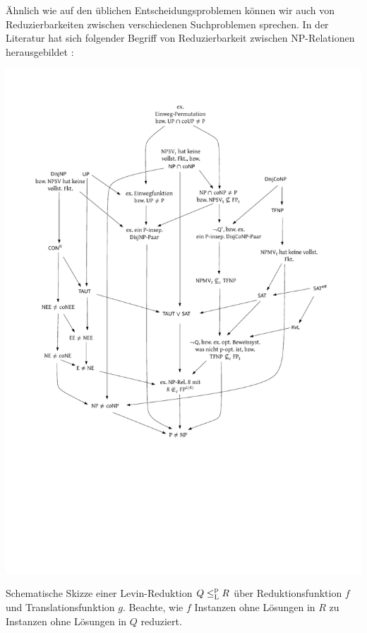 Ähnlich wie auf den üblichen Entscheidungsproblemen können wir auch von Reduzierbarkeiten zwischen verschiedenen Suchproblemen sprechen. In der Literatur hat sich folgender Begriff von Reduzierbarkeit zwischen NP-Relationen herausgebildet \parencites(vgl.)()[229]{papadimitriou_computational_1994}[61]{goldreich_computational_2008}[50]{arora_computational_2009}:
\begin{marginfigure}[-2cm]
    \centering\includegraphics[page=11]{figures.pdf}\vspace*{2ex}
    \caption{Schematische Skizze einer Levin-Reduktion $Q\leq_\mathrm{L}^\mathrm{p} R$ über Reduktionsfunktion $f$ und Translationsfunktion $g$. Beachte, wie $f$ Instanzen ohne Lösungen in $R$ zu Instanzen ohne Lösungen in $Q$ reduziert.}
\end{marginfigure}

